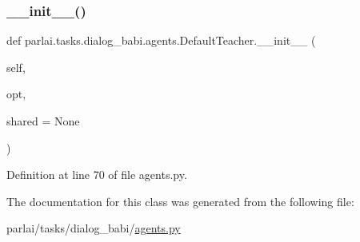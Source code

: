 \subsubsection{\texorpdfstring{\+\_\+\+\_\+init\+\_\+\+\_\+()}{\_\_init\_\_()}}
{\footnotesize\ttfamily def parlai.\+tasks.\+dialog\+\_\+babi.\+agents.\+Default\+Teacher.\+\_\+\+\_\+init\+\_\+\+\_\+ (\begin{DoxyParamCaption}\item[{}]{self,  }\item[{}]{opt,  }\item[{}]{shared = {\ttfamily None} }\end{DoxyParamCaption})}



Definition at line 70 of file agents.\+py.




The documentation for this class was generated from the following file\+:\begin{DoxyCompactItemize}
\item 
parlai/tasks/dialog\+\_\+babi/\hyperlink{parlai_2tasks_2dialog__babi_2agents_8py}{agents.\+py}\end{DoxyCompactItemize}
